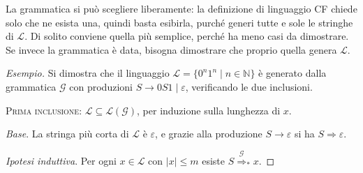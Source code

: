 \documentclass[a4paper, 11pt, oneside]{book}
\theoremstyle{formale}
\newenvironment{esempio}
    {\begin{proof}[\textit{Esempio}]\renewcommand{\qedsymbol}{$\diamond$}}
    {\end{proof}}
\begin{document}
    La grammatica si pu\`o scegliere liberamente: la definizione di linguaggio CF chiede solo
    che ne esista una, quindi basta esibirla, purch\'e generi tutte e sole le stringhe di
    $\mathcal{L}$. Di solito conviene quella pi\`u semplice, perch\'e ha meno casi da
    dimostrare. Se invece la grammatica \`e data, bisogna dimostrare che proprio quella
    genera $\mathcal{L}$.

    \begin{esempio}
        Si dimostra che il linguaggio $\mathcal{L} = \{0^n 1^n \mid n \in \mathbb{N}\}$ \`e
        generato dalla grammatica $\mathcal{G}$ con produzioni $S \to 0S1 \mid \varepsilon$,
        verificando le due inclusioni.

        \medskip
        \noindent\textsc{Prima inclusione}: $\mathcal{L} \subseteq \mathcal{L}(\mathcal{G})$,
        per induzione sulla lunghezza di $x$.

        \textit{Base}. La stringa pi\`u corta di $\mathcal{L}$ \`e $\varepsilon$, e grazie
        alla produzione $S \to \varepsilon$ si ha $S \Rightarrow \varepsilon$.

        \textit{Ipotesi induttiva}. Per ogni $x \in \mathcal{L}$ con $|x| \leq m$ esiste
        $S \overset{\mathcal{G}}{\Rightarrow}_* x$.


\end{esempio}
\end{document}
